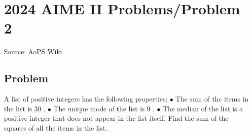 \documentclass[12pt]{article}
\begin{document}
\section*{{2024 AIME II Problems/Problem 2}}
Source: AoPS Wiki

\subsection*{Problem}
A list of positive integers has the following properties: $\bullet$ The sum of the items in the list is $30$ . $\bullet$ The unique mode of the list is $9$ . $\bullet$ The median of the list is a positive integer that does not appear in the list itself. Find the sum of the squares of all the items in the list.
\end{document}
